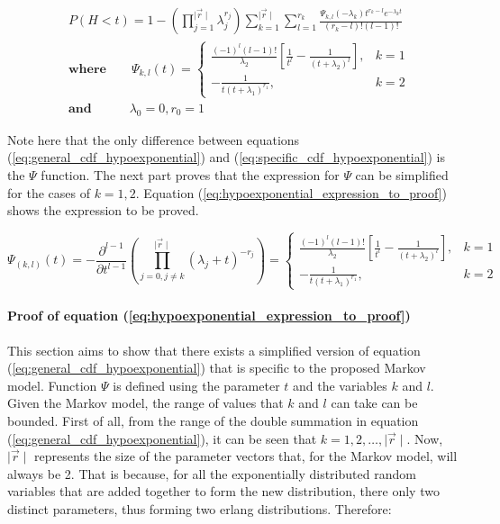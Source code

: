 \begin{align} \label{eq:specific_cdf_hypoexponential}
    & P(H < t) = 1 - \left( \prod_{j=1}^{\mid \vec{r} \mid} \lambda_j^{r_j} \right) 
    \sum_{k=1}^{\mid \vec{r} \mid} \sum_{l=1}^{r_k} \frac{\Psi_{k,l}(-\lambda_k)t^{r_k - l} 
    e^{-\lambda_k t}}{(r_k - l)! (l - 1)!} \nonumber \\ 
    & \textbf{where} \qquad \Psi_{k,l}(t) = 
    \begin{cases} 
        \frac{(-1)^{l} (l-1)!}{\lambda_2} \left[\frac{1}{t^l} - \frac{1}
        {(t + \lambda_2)^l}\right] , & k=1 \\
        - \frac{1}{t (t + \lambda_1)^{r_1}}, & k=2
    \end{cases} \nonumber \\
    & \textbf{and} \quad \qquad \lambda_0 = 0, r_0 = 1
\end{align}

Note here that the only difference between equations
(\ref{eq:general_cdf_hypoexponential}) and (\ref{eq:specific_cdf_hypoexponential}) 
is the \(\Psi\) function. 
The next part proves that the expression for \(\Psi\) can be simplified for the 
cases of \(k = 1,2\). 
Equation (\ref{eq:hypoexponential_expression_to_proof}) shows the expression to 
be proved.

\begin{equation} \label{eq:hypoexponential_expression_to_proof}
    \Psi_{(k,l)}(t) = - \frac{\partial^{l - 1}}{\partial t ^{l - 1}} 
    \left( \prod_{j = 0, j \neq k}^{\mid \vec{r} \mid} (\lambda_j + t)^{-r_j} \right) = 
    \begin{cases} 
        \frac{(-1)^{l} (l-1)!}{\lambda_2} \left[\frac{1}{t^l} - \frac{1}
        {(t + \lambda_2)^l}\right] , & k=1 \\
        - \frac{1}{t (t + \lambda_1)^{r_1}}, & k=2
    \end{cases}
\end{equation}



\paragraph{Proof of equation (\ref{eq:hypoexponential_expression_to_proof})}
 
This section aims to show that there exists a simplified version of equation 
(\ref{eq:general_cdf_hypoexponential}) that is specific to the proposed Markov 
model.
Function \(\Psi\) is defined using the parameter \(t\) and the variables \(k\) 
and \(l\).
Given the Markov model, the range of values that \(k\) and \(l\) can take can be
bounded.
First of all, from the range of the double summation in equation 
(\ref{eq:general_cdf_hypoexponential}), it can be seen that 
\(k = 1, 2, \dots, \mid \vec{r} \mid\).
Now, \(\mid \vec{r} \mid\) represents the size of the parameter vectors that, 
for the Markov model, will always be 2. 
That is because, for all the exponentially distributed random variables that are
added together to form the new distribution, there only two distinct parameters,
thus forming two erlang distributions. Therefore:

